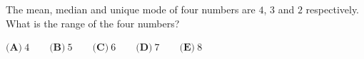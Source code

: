 The mean, median and unique mode of four numbers are $4$, $3$ and $2$ respectively. What is the range of the four numbers?

$\textbf{(A)}\ 4\qquad\textbf{(B)}\ 5\qquad\textbf{(C)}\ 6\qquad\textbf{(D)}\ 7\qquad\textbf{(E)}\ 8$
